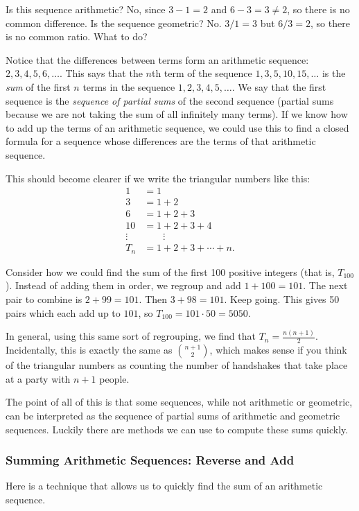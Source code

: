 \documentclass[12pt]{article}
\begin{document}
Is this sequence arithmetic?  No, since $3-1 = 2$ and $6-3 = 3 \ne 2$, so there is no common difference.  Is the sequence geometric?  No.  $3/1 = 3$ but $6/3 = 2$, so there is no common ratio.  What to do?  

Notice that the differences between terms form an arithmetic sequence: $2, 3, 4, 5, 6,\ldots$.  This says that the $n$th term of the sequence $1,3,5,10,15,\ldots$ is the {\em sum} of the first $n$ terms in the sequence $1,2,3,4,5,\ldots$.  We say that the first sequence is the {\em sequence of partial sums} of the second sequence (partial sums because we are not taking the sum of all infinitely many terms). If we know how to add up the terms of an arithmetic sequence, we could use this to find a closed formula for a sequence whose differences are the terms of that arithmetic sequence. 

This should become clearer if we write the triangular numbers like this:
\begin{align*}
1 &= 1\\
3 &= 1+2\\
6 &= 1 + 2 + 3\\
10 &= 1+2 + 3+ 4\\
\vdots & \qquad \vdots \\
T_n &= 1 + 2 + 3 + \cdots + n.
\end{align*}

Consider how we could find the sum of the first 100 positive integers (that is, $T_{100}$).  Instead of adding them in order, we regroup and add $1+100 = 101$.  The next pair to combine is $2+99 = 101$.  Then $3+98 = 101$.  Keep going.  This gives 50 pairs which each add up to $101$, so $T_{100} = 101\cdot 50 = 5050$.

In general, using this same sort of regrouping, we find that $T_n = \frac{n(n+1)}{2}$.  Incidentally, this is exactly the same as ${n+1 \choose 2}$, which makes sense if you think of the triangular numbers as counting the number of handshakes that take place at a party with $n+1$ people.

The point of all of this is that some sequences, while not arithmetic or geometric, can be interpreted as the sequence of partial sums of arithmetic and geometric sequences.  Luckily there are methods we can use to compute these sums quickly.

\subsubsection*{Summing Arithmetic Sequences: Reverse and Add}
Here is a technique that allows us to quickly find the sum of an arithmetic sequence. 
\end{document}

